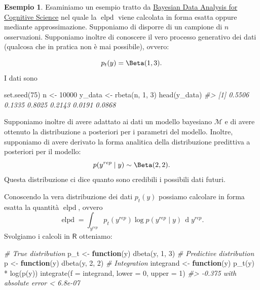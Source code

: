 \documentclass[
  10pt,
  italian,
  a4paper,
  extrafontsizes,onecolumn,openright
  ]{memoir}
\newenvironment{Shaded}{\begin{snugshade}}{\end{snugshade}}
\newcommand{\AttributeTok}[1]{\textcolor[rgb]{0.77,0.63,0.00}{#1}}
\newcommand{\CommentTok}[1]{\textcolor[rgb]{0.56,0.35,0.01}{\textit{#1}}}
\newcommand{\ControlFlowTok}[1]{\textcolor[rgb]{0.13,0.29,0.53}{\textbf{#1}}}
\newcommand{\DecValTok}[1]{\textcolor[rgb]{0.00,0.00,0.81}{#1}}
\newcommand{\FunctionTok}[1]{\textcolor[rgb]{0.00,0.00,0.00}{#1}}
\newcommand{\NormalTok}[1]{#1}
\newcommand{\OtherTok}[1]{\textcolor[rgb]{0.56,0.35,0.01}{#1}}
\newcommand{\SpecialCharTok}[1]{\textcolor[rgb]{0.00,0.00,0.00}{#1}}
\DeclareMathOperator{\elpd}{elpd} %
\newcommand{\R}{\textsf{R}} %
\theoremstyle{definition}
\theoremstyle{definition}
\newtheorem{example}{Esempio}[chapter]
\theoremstyle{definition}
\theoremstyle{definition}
\theoremstyle{remark}
\begin{document}
\begin{example}

Esaminiamo un esempio tratto da \href{https://vasishth.github.io/bayescogsci/book/expected-log-predictive-density-of-a-model.html}{Bayesian Data Analysis for Cognitive Science} nel quale la \(\elpd\) viene calcolata in forma esatta oppure mediante approssimazione. Supponiamo di disporre di un campione di \(n\) osservazioni. Supponiamo inoltre di conoscere il vero processo generativo dei dati (qualcosa che in pratica non è mai possibile), ovvero:

\[
p_t(y) = \Beta(1, 3).
\]
I dati sono

\begin{Shaded}
\begin{Highlighting}[]
\FunctionTok{set.seed}\NormalTok{(}\DecValTok{75}\NormalTok{)}
\NormalTok{n }\OtherTok{\textless{}{-}} \DecValTok{10000}
\NormalTok{y\_data }\OtherTok{\textless{}{-}} \FunctionTok{rbeta}\NormalTok{(n, }\DecValTok{1}\NormalTok{, }\DecValTok{3}\NormalTok{)}
\FunctionTok{head}\NormalTok{(y\_data)}
\CommentTok{\#\textgreater{} [1] 0.5506 0.1335 0.8025 0.2143 0.0191 0.0868}
\end{Highlighting}
\end{Shaded}

\noindent
Supponiamo inoltre di avere adattato ai dati un modello bayesiano \(\mathcal{M}\) e di avere ottenuto la distribuzione a posteriori per i parametri del modello. Inoltre, supponiamo di avere derivato la forma analitica della distribuzione predittiva a posteriori per il modello:
\[
p(y^{rep} \mid y) \sim \Beta(2, 2).
\]
Questa distribuzione ci dice quanto sono credibili i possibili dati futuri.

Conoscendo la vera distribuzione dei dati \(p_t(y)\) possiamo calcolare in forma esatta la quantità \(\elpd\), ovvero
\[
\elpd = \int_{y^{rep}}p_{t}(y^{rep})\log p(y^{rep} \mid y) \,\operatorname {d}\!y^{rep}.
\]
\noindent
Svolgiamo i calcoli in \(\R\) otteniamo:

\begin{Shaded}
\begin{Highlighting}[]
\CommentTok{\# True distribution}
\NormalTok{p\_t }\OtherTok{\textless{}{-}} \ControlFlowTok{function}\NormalTok{(y) }\FunctionTok{dbeta}\NormalTok{(y, }\DecValTok{1}\NormalTok{, }\DecValTok{3}\NormalTok{)}
\CommentTok{\# Predictive distribution}
\NormalTok{p }\OtherTok{\textless{}{-}} \ControlFlowTok{function}\NormalTok{(y) }\FunctionTok{dbeta}\NormalTok{(y, }\DecValTok{2}\NormalTok{, }\DecValTok{2}\NormalTok{)}
\CommentTok{\# Integration}
\NormalTok{integrand }\OtherTok{\textless{}{-}} \ControlFlowTok{function}\NormalTok{(y) }\FunctionTok{p\_t}\NormalTok{(y) }\SpecialCharTok{*} \FunctionTok{log}\NormalTok{(}\FunctionTok{p}\NormalTok{(y))}
\FunctionTok{integrate}\NormalTok{(}\AttributeTok{f =}\NormalTok{ integrand, }\AttributeTok{lower =} \DecValTok{0}\NormalTok{, }\AttributeTok{upper =} \DecValTok{1}\NormalTok{)}
\CommentTok{\#\textgreater{} {-}0.375 with absolute error \textless{} 6.8e{-}07}
\end{Highlighting}
\end{Shaded}


\end{example}
\end{document}
